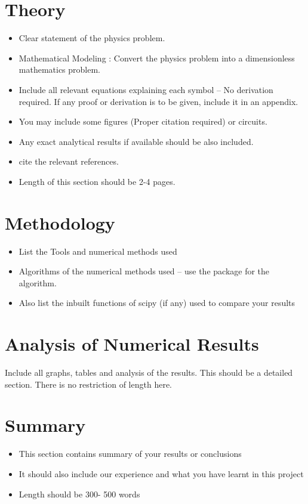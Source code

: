 \documentclass[12pt]{article}
\begin{document}
\section{Theory}
\label{sec:theory}
\begin{itemize}
    \item Clear statement of the physics problem.
    \item Mathematical Modeling : Convert the physics problem into a dimensionless mathematics problem.
    \item Include all relevant equations explaining each symbol -- No derivation required. If any proof or derivation is to be given, include it in an appendix.
    \item You may include some figures (Proper citation required) or circuits.
    \item Any exact analytical results if available should be also included.
    \item cite the relevant references.
    \item Length of this section should be 2-4 pages.
\end{itemize}

\section{Methodology}
\label{sec:method}
\begin{itemize}
    \item List the Tools and numerical methods used
    \item Algorithms of the numerical methods used -- use the package for the algorithm.
    \item Also list the inbuilt functions of scipy (if any) used to compare your results
\end{itemize}
\section{Analysis of Numerical Results}
Include all graphs, tables and analysis of the results. This should be a detailed section. There is no restriction of length here.
\section{Summary}
\label{sec:summary}
\begin{itemize}
    \item This section contains summary of your results or conclusions
    \item It should also include our experience and what you have learnt in this project
    \item Length should be 300- 500 words 
\end{itemize}
\end{document}
